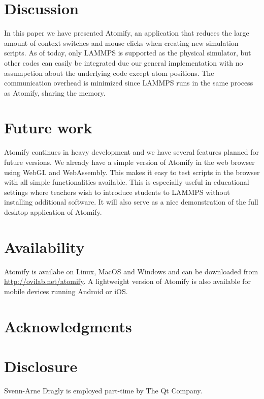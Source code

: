 \documentclass[12pt,a4paper,final]{iopart}
\begin{document}
\section{\label{sec:discussion}Discussion}
In this paper we have presented Atomify, an application that reduces the large amount of context switches and mouse clicks
when creating new simulation scripts.
As of today, only LAMMPS is supported as the physical simulator, but other codes can easily be integrated
due our general implementation with no assumpetion about the underlying code except atom positions.
The communication overhead is minimized since LAMMPS runs in the same process as Atomify, sharing the memory.

\section{\label{sec:future}Future work}
Atomify continues in heavy development and we have several features planned for future versions.
We already have a simple version of Atomify in the web browser using WebGL and WebAssembly.
This makes it easy to test scripts in the browser with all simple functionalities available.
This is especially useful in educational settings where teachers wish to introduce students
to LAMMPS without installing additional software.
It will also serve as a nice demonstration of the full desktop application of Atomify.

\section{Availability}
Atomify is availabe on Linux, MacOS and Windows and can be downloaded from
\href{https://ovilab.net/atomify}{http://ovilab.net/atomify}.
A lightweight version of Atomify is also available for mobile devices running
Android or iOS.

\section{Acknowledgments}

\section{Disclosure}

Svenn-Arne Dragly is employed part-time by The Qt Company.






\end{document}
